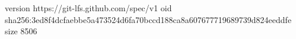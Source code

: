 version https://git-lfs.github.com/spec/v1
oid sha256:3ed8f4dcfaebbe5a473524d6fa70bccd188ca8a607677719689739d824eeddfe
size 8506
